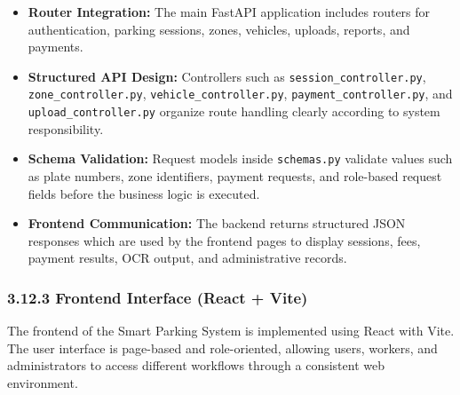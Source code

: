 \documentclass[12pt,a4paper,oneside]{report}
\begin{document}
\begin{itemize}[leftmargin=2em]
    \item \textbf{Router Integration:} The main FastAPI application includes routers for authentication, parking sessions, zones, vehicles, uploads, reports, and payments.

    \item \textbf{Structured API Design:} Controllers such as \texttt{session\_\allowbreak controller.py}, \texttt{zone\_\allowbreak controller.py}, \texttt{vehicle\_\allowbreak controller.py}, \texttt{payment\_\allowbreak controller.py}, and \texttt{upload\_\allowbreak controller.py} organize route handling clearly according to system responsibility.

    \item \textbf{Schema Validation:} Request models inside \texttt{schemas.py} validate values such as plate numbers, zone identifiers, payment requests, and role-based request fields before the business logic is executed.

    \item \textbf{Frontend Communication:} The backend returns structured JSON responses which are used by the frontend pages to display sessions, fees, payment results, OCR output, and administrative records.
\end{itemize}

\subsubsection*{3.12.3 Frontend Interface (React + Vite)}

The frontend of the Smart Parking System is implemented using React with Vite. The user interface is page-based and role-oriented, allowing users, workers, and administrators to access different workflows through a consistent web environment.
\end{document}
